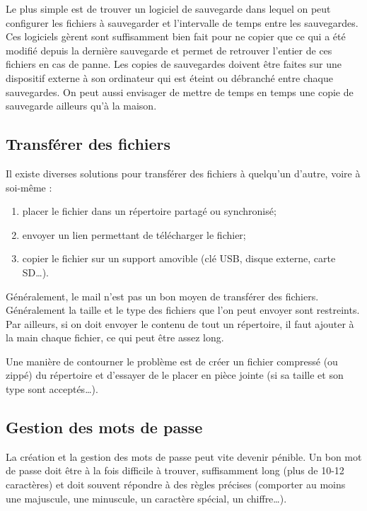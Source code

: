 \documentclass[10pt,a4paper]{report}
\begin{document}
Le plus simple est de trouver un logiciel de sauvegarde dans lequel on peut configurer les fichiers à sauvegarder et l'intervalle de temps entre les sauvegardes. Ces logiciels gèrent sont suffisamment bien fait pour ne copier que ce qui a été modifié depuis la dernière sauvegarde et permet de retrouver l'entier de ces fichiers en cas de panne. Les copies de sauvegardes doivent être faites sur une dispositif externe à son ordinateur qui est éteint ou débranché entre chaque sauvegardes. On peut aussi envisager de mettre de temps en temps une copie de sauvegarde ailleurs qu'à la maison.



\subsection{Transférer des fichiers}

Il existe diverses solutions pour transférer des fichiers à quelqu'un d'autre, voire à soi-même :
\begin{enumerate}
	\item placer le fichier dans un répertoire partagé ou synchronisé;
	\item envoyer un lien permettant de télécharger le fichier;
	\item copier le fichier sur un support amovible (clé USB, disque externe, carte SD\dots).
\end{enumerate}

Généralement, le mail n'est pas un bon moyen de transférer des fichiers. Généralement la taille et le type des fichiers que l'on peut envoyer sont restreints. Par ailleurs, si on doit envoyer le contenu de tout un répertoire, il faut ajouter à la main chaque fichier, ce qui peut être assez long.

Une manière de contourner le problème est de créer un fichier compressé (ou zippé) du répertoire et d'essayer de le placer en pièce jointe (si sa taille et son type sont acceptés\dots).



\subsection{Gestion des mots de passe}

La création et la gestion des mots de passe peut vite devenir pénible. Un bon mot de passe doit être à la fois difficile à trouver, suffisamment long (plus de 10-12 caractères) et doit souvent répondre à des règles précises (comporter au moins une majuscule, une minuscule, un caractère spécial, un chiffre\dots). 
\end{document}
